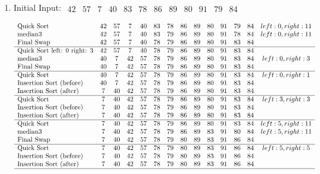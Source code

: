 \documentclass[10pt]{article}
\begin{document}
\begin{enumerate}
\item Initial Input: 
$
\begin{array}{cccccccccccc}
42 & 57 & 7 & 40 & 83 & 78 & 86 & 89 & 80 & 91 & 79 & 84
\end{array}
$

\[
\begin{array}{lccccccccccccc}
$Quick Sort$ & 42 & 57 & 7 & 40 & 83 & 78 & 86 & 89 & 80 & 91 & 79 & 84 & left: 0, right: 11\\
$median3$ & 42 & 57 & 7 & 40 & 83 & 79 & 86 & 89 & 80 & 91 & 78 & 84 & left: 0, right: 11\\
$Final Swap$& 42 & 57 & 7 & 40 & 78 & 79 & 86 & 89 & 80 & 91 & 83 & 84 \\ \hline
$Quick Sort left: 0 right: 3$ & 42 & 57 & 7 & 40 & 78 & 79 & 86 & 89 & 80 & 91 & 83 & 84 \\
$median3$ & 40 & 7 & 42 & 57 & 78 & 79 & 86 & 89 & 80 & 91 & 83 & 84 & left: 0, right: 3\\
$Final Swap$& 40 & 7 & 42 & 57 & 78 & 79 & 86 & 89 & 80 & 91 & 83 & 84 \\ \hline
$Quick Sort$ & 40 & 7 & 42 & 57 & 78 & 79 & 86 & 89 & 80 & 91 & 83 & 84 & left: 0, right: 1\\
$Insertion Sort (before) $& 40 & 7 & 42 & 57 & 78 & 79 & 86 & 89 & 80 & 91 & 83 & 84 \\
$Insertion Sort (after) $& 7 & 40 & 42 & 57 & 78 & 79 & 86 & 89 & 80 & 91 & 83 & 84 \\ \hline
$Quick Sort$ & 7 & 40 & 42 & 57 & 78 & 79 & 86 & 89 & 80 & 91 & 83 & 84 & left: 3, right: 3\\
$Insertion Sort (before)$& 7 & 40 & 42 & 57 & 78 & 79 & 86 & 89 & 80 & 91 & 83 & 84 \\
$Insertion Sort (after)$& 7 & 40 & 42 & 57 & 78 & 79 & 86 & 89 & 80 & 91 & 83 & 84 \\ \hline
$Quick Sort$ & 7 & 40 & 42 & 57 & 78 & 79 & 86 & 89 & 80 & 91 & 83 & 84 & left: 5, right: 11\\
$median3$ & 7 & 40 & 42 & 57 & 78 & 79 & 86 & 89 & 83 & 91 & 80 & 84 & left: 5, right: 11\\
$Final Swap$& 7 & 40 & 42 & 57 & 78 & 79 & 80 & 89 & 83 & 91 & 86 & 84 \\ \hline
$Quick Sort$ & 7 & 40 & 42 & 57 & 78 & 79 & 80 & 89 & 83 & 91 & 86 & 84 & left: 5, right: 5\\
$Insertion Sort (before)$& 7 & 40 & 42 & 57 & 78 & 79 & 80 & 89 & 83 & 91 & 86 & 84 \\
$Insertion Sort (after)$& 7 & 40 & 42 & 57 & 78 & 79 & 80 & 89 & 83 & 91 & 86 & 84 \\ \hline

\end{array}\]
\end{enumerate}
\end{document}
